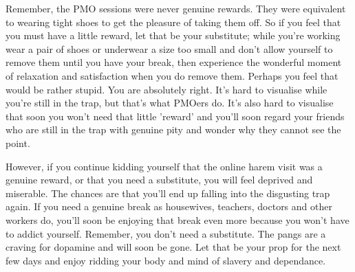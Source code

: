 \documentclass[easypeasy.tex]{subfiles}
\begin{document}
Remember, the PMO sessions were never genuine rewards. They were equivalent to wearing tight shoes to get the pleasure of taking them off. So if you feel that you must have a little reward, let that be your substitute; while you're working wear a pair of shoes or underwear a size too small and don't allow yourself to remove them until you have your break, then experience the wonderful moment of relaxation and satisfaction when you do remove them. Perhaps you feel that would be rather stupid. You are absolutely right. It's hard to visualise while you're still in the trap, but that's what PMOers do. It's also hard to visualise that soon you won't need that little 'reward' and you'll soon regard your friends who are still in the trap with genuine pity and wonder why they cannot see the point.

However, if you continue kidding yourself that the online harem visit was a genuine reward, or that you need a substitute, you will feel deprived and miserable. The chances are that you'll end up falling into the disgusting trap again. If you need a genuine break as housewives, teachers, doctors and other workers do, you'll soon be enjoying that break even more because you won't have to addict yourself. Remember, you don't need a substitute. The pangs are a craving for dopamine and will soon be gone. Let that be your prop for the next few days and enjoy ridding your body and mind of slavery and dependance.
\end{document}
